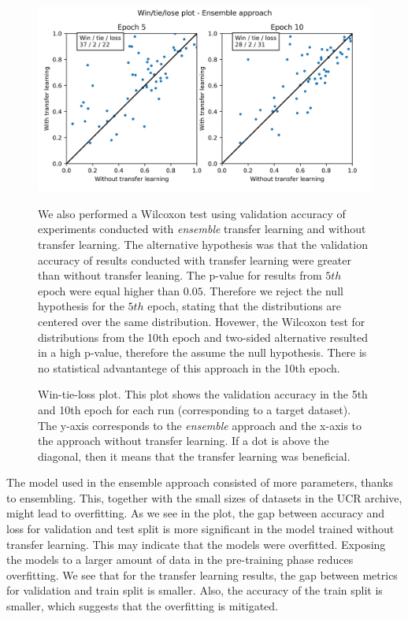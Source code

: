 \documentclass[a4paper,11pt,twoside]{report}
\theoremstyle{definition}
\begin{document}
\FloatBarrier
\begin{figure}[h!t]
\centering
\includegraphics[width=17 cm]{imgs/ensemble/win_tie_lose_epoch.png}
\caption{Win-tie-loss plot. This plot shows the validation accuracy in the 5th and 10th epoch for each run (corresponding to a target dataset). The y-axis corresponds to the \textit{ensemble} approach and the x-axis to the approach without transfer learning. If a dot is above the diagonal, then it means that the transfer learning was beneficial.}

We also performed a Wilcoxon test using validation accuracy of experiments conducted with \textit{ensemble} transfer learning and without transfer learning. The alternative hypothesis was that the validation accuracy of results conducted with transfer learning were greater than without transfer leaning. The p-value for results from $5th$ epoch were equal higher than $0.05$. Therefore we reject the null hypothesis for the $5th$ epoch, stating that the distributions are centered over the same distribution. Hovewer, the Wilcoxon test for distributions from the 10th epoch and two-sided alternative resulted in a high p-value, therefore the assume the null hypothesis. There is no statistical advantantege of this approach in the 10th epoch.
\label{fig:win_tie_loss_ensemble}
\end{figure}
The model used in the ensemble approach consisted of more parameters, thanks to ensembling. This, together with the small sizes of datasets in the UCR archive, might lead to overfitting. As we see in the plot, the gap between accuracy and loss for validation and test split is more significant in the model trained without transfer learning. This may indicate that the models were overfitted. Exposing the models to a larger amount of data in the pre-training phase reduces overfitting. We see that for the transfer learning results, the gap between metrics for validation and train split is smaller. Also, the accuracy of the train split is smaller, which suggests that the overfitting is mitigated.
\end{document}
